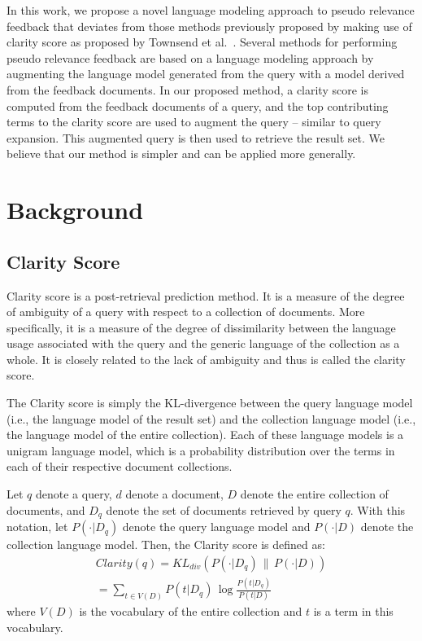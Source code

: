 \documentclass[format=sigconf, screen=true, review=false]{acmart}
\begin{document}
In this work, we propose a novel language modeling approach to pseudo relevance feedback that deviates from those methods previously proposed by making use of clarity score as proposed by Townsend et al.~\cite{10.1145/564376.564429}.
Several methods for performing pseudo relevance feedback are based on a language modeling approach by augmenting the language model generated from the query with a model derived from the feedback documents.
In our proposed method, a clarity score is computed from the feedback documents of a query, and the top contributing terms to the clarity score are used to augment the query -- similar to query expansion.
This augmented query is then used to retrieve the result set.
We believe that our method is simpler and can be applied more generally.


\section{Background}
\subsection{Clarity Score}
Clarity score is a post-retrieval prediction method.
It is a measure of the degree of ambiguity of a query with respect to a collection of documents.
More specifically, it is a measure of the degree of dissimilarity between the language usage associated with the query and the generic language of the collection as a whole.
It is closely related to the lack of ambiguity and thus is called the clarity score.

The Clarity score is simply the KL-divergence between the query language model (i.e., the language model of the result set) and the collection language model (i.e., the language model of the entire collection).
Each of these language models is a unigram language model, which is a probability distribution over the terms in each of their respective document collections.

Let $q$ denote a query, $d$ denote a document, $D$ denote the entire collection of documents, and $D_q$ denote the set of documents retrieved by query $q$.
With this notation, let $P(\cdot|D_q)$ denote the query language model and $P(\cdot|D)$ denote the collection language model.
Then, the Clarity score is defined as:
\begin{equation}
\label{equ:clarity-score}
\begin{split}
Clarity(q) = KL_{div}(P(\cdot | D_q)\, \|\, P(\cdot | D))\\
= \sum_{t \in V(D)} P(t | D_q)\, \log{\frac{P(t | D_q)}{P(t | D)}}
\end{split}
\end{equation}
where $V(D)$ is the vocabulary of the entire collection and $t$ is a term in this vocabulary.
\end{document}
